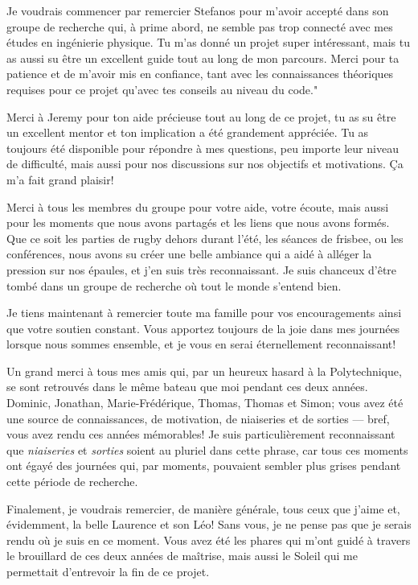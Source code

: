 \begin{comment}
\end{comment}


Je voudrais commencer par remercier Stefanos pour m'avoir accepté dans son groupe de recherche qui, à prime abord, ne semble pas trop connecté avec mes études en ingénierie physique.
Tu m'as donné un projet super intéressant, mais tu as aussi su être un excellent guide tout au long de mon parcours.
Merci pour ta patience et de m'avoir mis en confiance, tant avec les connaissances théoriques requises pour ce projet qu'avec tes conseils au niveau du code."

Merci à Jeremy pour ton aide précieuse tout au long de ce projet, tu as su être un excellent mentor et ton implication a été grandement appréciée.
Tu as toujours été disponible pour répondre à mes questions, peu importe leur niveau de difficulté, mais aussi pour nos discussions sur nos objectifs et motivations.
Ça m'a fait grand plaisir!

Merci à tous les membres du groupe pour votre aide, votre écoute, mais aussi pour les moments que nous avons partagés et les liens que nous avons formés.
Que ce soit les parties de rugby dehors durant l'été, les séances de frisbee, ou les conférences, nous avons su créer une belle ambiance qui a aidé à alléger la pression sur nos épaules, et j'en suis très reconnaissant.
Je suis chanceux d'être tombé dans un groupe de recherche où tout le monde s'entend bien.

Je tiens maintenant à remercier toute ma famille pour vos encouragements ainsi que votre soutien constant.
Vous apportez toujours de la joie dans mes journées lorsque nous sommes ensemble, et je vous en serai éternellement reconnaissant!

Un grand merci à tous mes amis qui, par un heureux hasard à la Polytechnique, se sont retrouvés dans le même bateau que moi pendant ces deux années.
Dominic, Jonathan, Marie-Frédérique, Thomas, Thomas et Simon; vous avez été une source de connaissances, de motivation, de niaiseries et de sorties — bref, vous avez rendu ces années mémorables!
Je suis particulièrement reconnaissant que \textit{niaiseries} et \textit{sorties} soient au pluriel dans cette phrase, car tous ces moments ont égayé des journées qui, par moments, pouvaient sembler plus grises pendant cette période de recherche.

Finalement, je voudrais remercier, de manière générale, tous ceux que j'aime et, évidemment, la belle Laurence et son Léo!
Sans vous, je ne pense pas que je serais rendu où je suis en ce moment.
Vous avez été les phares qui m'ont guidé à travers le brouillard de ces deux années de maîtrise, mais aussi le Soleil qui me permettait d'entrevoir la fin de ce projet.

